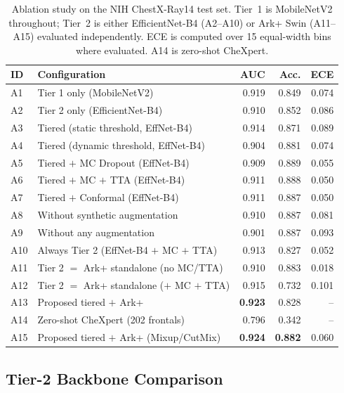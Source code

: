 \documentclass[diagnostics,article,submit,moreauthors]{Definitions/mdpi}
\begin{document}
\begin{table}[H]
\caption{Ablation study on the NIH ChestX-Ray14 test set. Tier~1 is MobileNetV2 throughout; Tier~2 is either EfficientNet-B4 (A2--A10) or Ark+ Swin (A11--A15) evaluated independently. ECE is computed over 15 equal-width bins where evaluated. A14 is zero-shot CheXpert.}\label{tab:ablation}
\begin{tabular}{@{}llrrr@{}}
\toprule
ID & Configuration & AUC & Acc. & ECE\\
\midrule
A1 & Tier 1 only (MobileNetV2) & 0.919 & 0.849 & 0.074\\
A2 & Tier 2 only (EfficientNet-B4) & 0.910 & 0.852 & 0.086\\
A3 & Tiered (static threshold, EffNet-B4) & 0.914 & 0.871 & 0.089\\
A4 & Tiered (dynamic threshold, EffNet-B4) & 0.904 & 0.881 & 0.074\\
A5 & Tiered $+$ MC Dropout (EffNet-B4) & 0.909 & 0.889 & 0.055\\
A6 & Tiered $+$ MC $+$ TTA (EffNet-B4) & 0.911 & 0.888 & 0.050\\
A7 & Tiered $+$ Conformal (EffNet-B4) & 0.911 & 0.887 & 0.050\\
A8 & Without synthetic augmentation & 0.910 & 0.887 & 0.081\\
A9 & Without any augmentation & 0.901 & 0.887 & 0.093\\
A10 & Always Tier 2 (EffNet-B4 $+$ MC $+$ TTA) & 0.913 & 0.827 & 0.052\\
A11 & Tier 2 $=$ Ark+ standalone (no MC/TTA) & 0.910 & 0.883 & 0.018\\
A12 & Tier 2 $=$ Ark+ standalone ($+$ MC $+$ TTA) & 0.915 & 0.732 & 0.101\\
A13 & Proposed tiered $+$ Ark+ & \textbf{0.923} & 0.828 & --\\
A14 & Zero-shot CheXpert (202 frontals) & 0.796 & 0.342 & --\\
A15 & Proposed tiered $+$ Ark+ (Mixup/CutMix) & \textbf{0.924} & \textbf{0.882} & 0.060\\
\bottomrule
\end{tabular}
\end{table}

\subsection{Tier-2 Backbone Comparison}
\end{document}
